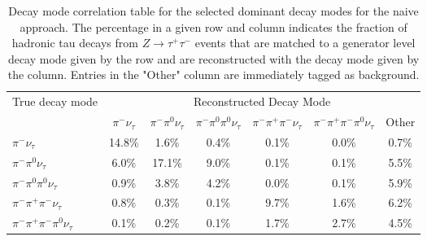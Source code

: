
\begin{table}[htp]
   \centering
   \begin{tabular}{l|cccccc}

\multirow{2}{*}{True decay mode} & \multicolumn{6}{c}{Reconstructed Decay Mode}\\

 & $\pi^{-}\nu_\tau$ & $\pi^{-}\pi^0\nu_\tau$ & $\pi^{-}\pi^0\pi^0\nu_\tau$ & $\pi^{-}\pi^{+}\pi^{-}\nu_\tau$ & $\pi^{-}\pi^{+}\pi^{-}\pi^0\nu_\tau$& Other \\
\hline
$\pi^{-}\nu_\tau$ & 14.8\% &1.6\% &0.4\% &0.1\% &0.0\% & 0.7\% \\
$\pi^{-}\pi^0\nu_\tau$ & 6.0\% &17.1\% &9.0\% &0.1\% &0.1\% & 5.5\% \\
$\pi^{-}\pi^0\pi^0\nu_\tau$ & 0.9\% &3.8\% &4.2\% &0.0\% &0.1\% & 5.9\% \\
$\pi^{-}\pi^{+}\pi^{-}\nu_\tau$ & 0.8\% &0.3\% &0.1\% &9.7\% &1.6\% & 6.2\% \\
$\pi^{-}\pi^{+}\pi^{-}\pi^0\nu_\tau$ & 0.1\% &0.2\% &0.1\% &1.7\% &2.7\% & 4.5\% \\

\end{tabular}
\label{tab:dmResolutionNoNothing}
\caption{Decay mode correlation table for the selected dominant decay modes
for the naive approach.  The percentage in a given row and column indicates
the fraction of hadronic tau decays from $Z\rightarrow\tau^{+}\tau^{-}$ events
that are matched to a generator level decay mode
given by the row and are reconstructed with the decay mode given by the column.
Entries in the "Other" column are immediately tagged as background.
}
\end{table}
